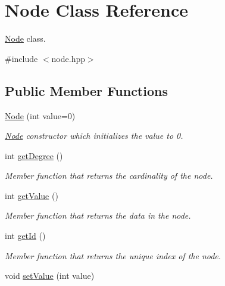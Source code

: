 \hypertarget{classNode}{\section{Node Class Reference}
\label{classNode}
}


\hyperlink{classNode}{Node} class.  




{\ttfamily \#include $<$node.\-hpp$>$}

\subsection*{Public Member Functions}
\begin{DoxyCompactItemize}
\item 
\hypertarget{classNode_ade1e047dd798bfbcb525c829e5a54d06}{\hyperlink{classNode_ade1e047dd798bfbcb525c829e5a54d06}{Node} (int value=0)}\label{classNode_ade1e047dd798bfbcb525c829e5a54d06}

\begin{DoxyCompactList}\small\item\em \hyperlink{classNode}{Node} constructor which initializes the value to 0. \end{DoxyCompactList}\item 
\hypertarget{classNode_ab06afc516052033f763b45d8b893ce03}{int \hyperlink{classNode_ab06afc516052033f763b45d8b893ce03}{get\-Degree} ()}\label{classNode_ab06afc516052033f763b45d8b893ce03}

\begin{DoxyCompactList}\small\item\em Member function that returns the cardinality of the node. \end{DoxyCompactList}\item 
\hypertarget{classNode_affbe7f986fd7ed645c5bc361363e96ec}{int \hyperlink{classNode_affbe7f986fd7ed645c5bc361363e96ec}{get\-Value} ()}\label{classNode_affbe7f986fd7ed645c5bc361363e96ec}

\begin{DoxyCompactList}\small\item\em Member function that returns the data in the node. \end{DoxyCompactList}\item 
\hypertarget{classNode_a3c7b8ccf4dab44216b997c5f63f11d9f}{int \hyperlink{classNode_a3c7b8ccf4dab44216b997c5f63f11d9f}{get\-Id} ()}\label{classNode_a3c7b8ccf4dab44216b997c5f63f11d9f}

\begin{DoxyCompactList}\small\item\em Member function that returns the unique index of the node. \end{DoxyCompactList}\item 
\hypertarget{classNode_a9e337c1790152faf945a87207d7e1125}{void \hyperlink{classNode_a9e337c1790152faf945a87207d7e1125}{set\-Value} (int value)}\label{classNode_a9e337c1790152faf945a87207d7e1125}


\end{DoxyCompactItemize}
